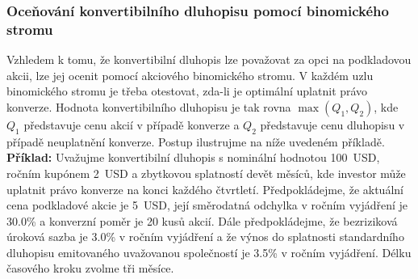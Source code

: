 \documentclass[a4paper]{book}
\begin{document}
\subsubsection{Oceňování konvertibilního dluhopisu pomocí binomického stromu}

Vzhledem k tomu, že konvertibilní dluhopis lze považovat za opci na podkladovou akcii, lze jej ocenit pomocí akciového binomického stromu. V každém uzlu binomického stromu je třeba otestovat, zda-li je optimální uplatnit právo konverze. Hodnota konvertibilního dluhopisu je tak rovna $\max(Q_1, Q_2)$, kde $Q_1$ představuje cenu akcií v případě konverze a $Q_2$ představuje cenu dluhopisu v případě neuplatnění konverze. Postup ilustrujme na níže uvedeném příkladě.\\

\noindent \textbf{Příklad:} Uvažujme konvertibilní dluhopis s nominální hodnotou 100~USD, ročním kupónem 2~USD a zbytkovou splatností devět měsíců, kde investor může uplatnit právo konverze na konci každého čtvrtletí. Předpokládejme, že aktuální cena podkladové akcie je 5~USD, její směrodatná odchylka v ročním vyjádření je 30.0\% a konverzní poměr je 20 kusů akcií. Dále předpokládejme, že bezriziková úroková sazba je 3.0\% v ročním vyjádření a že výnos do splatnosti standardního dluhopisu emitovaného uvažovanou společností je 3.5\% v ročním vyjádření. Délku časového kroku zvolme tři měsíce.
\end{document}
